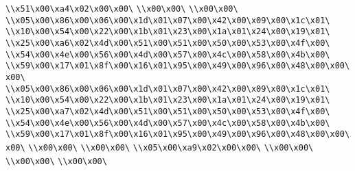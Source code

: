 \verb|\\x51\x00\xa4\x02\x00\x00\|\newline
\verb|\\x00\x00\|\newline
\verb|\\x00\x00\|\newline
\verb|\\x05\x00\x86\x00\x06\x00\x1d\x01\x07\x00\x42\x00\x09\x00\x1c\x01\|\newline
\verb|\\x10\x00\x54\x00\x22\x00\x1b\x01\x23\x00\x1a\x01\x24\x00\x19\x01\|\newline
\verb|\\x25\x00\xa6\x02\x4d\x00\x51\x00\x51\x00\x50\x00\x53\x00\x4f\x00\|\newline
\verb|\\x54\x00\x4e\x00\x56\x00\x4d\x00\x57\x00\x4c\x00\x58\x00\x4b\x00\|\newline
\verb|\\x59\x00\x17\x01\x8f\x00\x16\x01\x95\x00\x49\x00\x96\x00\x48\x00\x00\x00\|\newline
\verb|\\x05\x00\x86\x00\x06\x00\x1d\x01\x07\x00\x42\x00\x09\x00\x1c\x01\|\newline
\verb|\\x10\x00\x54\x00\x22\x00\x1b\x01\x23\x00\x1a\x01\x24\x00\x19\x01\|\newline
\verb|\\x25\x00\xa7\x02\x4d\x00\x51\x00\x51\x00\x50\x00\x53\x00\x4f\x00\|\newline
\verb|\\x54\x00\x4e\x00\x56\x00\x4d\x00\x57\x00\x4c\x00\x58\x00\x4b\x00\|\newline
\verb|\\x59\x00\x17\x01\x8f\x00\x16\x01\x95\x00\x49\x00\x96\x00\x48\x00\x00\x00\|\newline
\verb|\\x00\x00\|\newline
\verb|\\x00\x00\|\newline
\verb|\\x05\x00\xa9\x02\x00\x00\|\newline
\verb|\\x00\x00\|\newline
\verb|\\x00\x00\|\newline
\verb|\\x00\x00\|\newline
